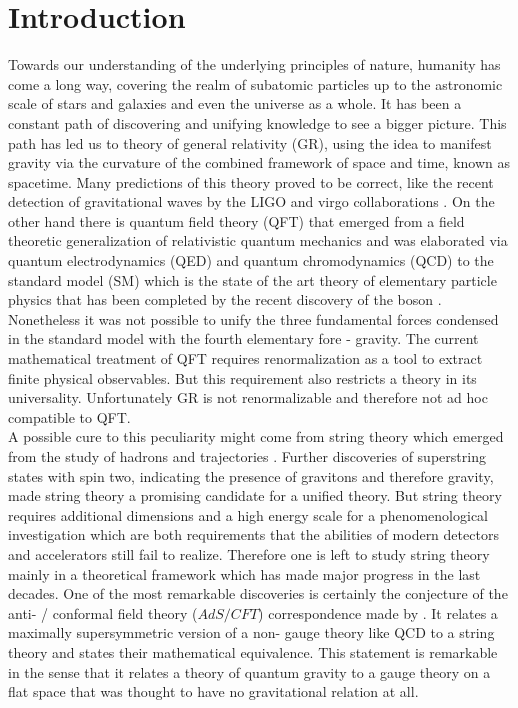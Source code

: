 \chapter{Introduction}
Towards our understanding of the underlying principles of nature, humanity has come a long way, covering the realm of subatomic particles up to the astronomic scale of stars and galaxies and even the universe as a whole. It has been a constant path of discovering and unifying knowledge to see a bigger picture. This path has led us to  theory of general relativity (GR), using the idea to manifest gravity via the curvature of the combined framework of space and time, known as spacetime. Many predictions of this theory proved to be correct, like the recent detection of gravitational waves by the LIGO and virgo collaborations \cite{Abbott:2016blz,Abbott:2016nmj}. On the other hand there is quantum field theory (QFT) that emerged from a field theoretic generalization of relativistic quantum mechanics and was elaborated via quantum electrodynamics (QED) and quantum chromodynamics (QCD) to the standard model (SM) which is the state of the art theory of elementary particle physics that has been completed by the recent discovery of the  boson \cite{Chatrchyan:2012xdj,Aad:2012tfa}. Nonetheless it was not possible to unify the three fundamental forces condensed in the standard model with the fourth elementary fore - gravity. The current mathematical treatment of QFT requires renormalization as a tool to extract finite physical observables. But this requirement also restricts a theory in its universality. Unfortunately GR is not renormalizable and therefore not ad hoc compatible to QFT.\\
A possible cure to this peculiarity might come from string theory which emerged from the study of hadrons and  trajectories \cite{Veneziano:1968yb}. Further discoveries of superstring states with spin two, indicating the presence of gravitons and therefore gravity, made string theory a promising candidate for a unified theory. But string theory requires additional dimensions and a high energy scale for a phenomenological investigation which are both requirements that the abilities of modern detectors and accelerators still fail to realize. Therefore one is left to study string theory mainly in a theoretical framework which has made major progress in the last decades. One of the most remarkable discoveries is certainly the conjecture of the anti- / conformal field theory ($AdS/CFT$) correspondence made by  \cite{maldacena1}. It relates a maximally supersymmetric version of a non- gauge theory like QCD to a string theory and states their mathematical equivalence. This statement is remarkable in the sense that it relates a theory of quantum gravity to a gauge theory on a flat space that was thought to have no gravitational relation at all.\\
